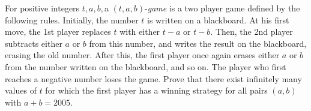 For positive integers $t,a,b,$a $(t,a,b)$-\textit{game} is a two player game defined by the following rules. Initially, the number $t$ is written on a blackboard. At his first move, the 1st player replaces $t$ with either $t-a$ or $t-b$. Then, the 2nd player subtracts either $a$ or $b$ from this number, and writes the result on the blackboard, erasing the old number. After this, the first player once again erases either $a$ or $b$ from the number written on the blackboard, and so on. The player who first reaches a negative number loses the game. Prove that there exist infinitely many values of $t$ for which the first player has a winning strategy for all pairs $(a,b)$ with $a+b=2005$.